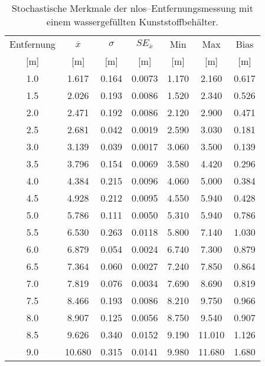 \begin{appendices}
\begin{table}[h]
	\centering
	\begin{tabular}{||c||ccc||cc||c||}
\hline
Entfernung & $\overline{x}$ & $\sigma$ & $SE_{\overline{x}}$ & Min & Max & Bias \\
{[}\si{\meter}{]} & {[}\si{\meter}{]} & {[}\si{\meter}{]} & {[}\si{\meter}{]} & {[}\si{\meter}{]} & {[}\si{\meter}{]} & {[}\si{\meter}{]} \\
\hline
\hline
\num{1.0} & \num{1.617} & \num{0.164} & \num{0.0073} & \num{1.170} & \num{2.160} & \num{0.617} \\
\num{1.5} & \num{2.026} & \num{0.193} & \num{0.0086} & \num{1.520} & \num{2.340} & \num{0.526} \\
\num{2.0} & \num{2.471} & \num{0.192} & \num{0.0086} & \num{2.120} & \num{2.900} & \num{0.471} \\
\num{2.5} & \num{2.681} & \num{0.042} & \num{0.0019} & \num{2.590} & \num{3.030} & \num{0.181} \\
\num{3.0} & \num{3.139} & \num{0.039} & \num{0.0017} & \num{3.060} & \num{3.500} & \num{0.139} \\
\num{3.5} & \num{3.796} & \num{0.154} & \num{0.0069} & \num{3.580} & \num{4.420} & \num{0.296} \\
\num{4.0} & \num{4.384} & \num{0.215} & \num{0.0096} & \num{4.060} & \num{5.000} & \num{0.384} \\
\num{4.5} & \num{4.928} & \num{0.212} & \num{0.0095} & \num{4.550} & \num{5.940} & \num{0.428} \\
\num{5.0} & \num{5.786} & \num{0.111} & \num{0.0050} & \num{5.310} & \num{5.940} & \num{0.786} \\
\num{5.5} & \num{6.530} & \num{0.263} & \num{0.0118} & \num{5.800} & \num{7.140} & \num{1.030} \\
\num{6.0} & \num{6.879} & \num{0.054} & \num{0.0024} & \num{6.740} & \num{7.300} & \num{0.879} \\
\num{6.5} & \num{7.364} & \num{0.060} & \num{0.0027} & \num{7.240} & \num{7.850} & \num{0.864} \\
\num{7.0} & \num{7.819} & \num{0.076} & \num{0.0034} & \num{7.690} & \num{8.690} & \num{0.819} \\
\num{7.5} & \num{8.466} & \num{0.193} & \num{0.0086} & \num{8.210} & \num{9.750} & \num{0.966} \\
\num{8.0} & \num{8.907} & \num{0.125} & \num{0.0056} & \num{8.750} & \num{9.540} & \num{0.907} \\
\num{8.5} & \num{9.626} & \num{0.340} & \num{0.0152} & \num{9.190} & \num{11.010} & \num{1.126} \\
\num{9.0} & \num{10.680} & \num{0.315} & \num{0.0141} & \num{9.980} & \num{11.680} & \num{1.680} \\
\hline
	\end{tabular}
	\caption{Stochastische Merkmale der \Gls{nlos}--Entfernungsmessung mit einem wassergefüllten Kunststoffbehälter.}
	\label{tab:entfernungsmessung_2018_01_20_nlos_water}
\end{table}


\end{appendices}
